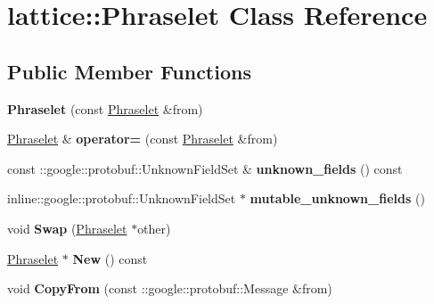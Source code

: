 \hypertarget{classlattice_1_1Phraselet}{
\section{lattice::Phraselet Class Reference}
\label{classlattice_1_1Phraselet}
}
\subsection*{Public Member Functions}
\begin{DoxyCompactItemize}
\item 
\hypertarget{classlattice_1_1Phraselet_aad52fffee57cf2c3c738db3911eb4bb9}{
{\bfseries Phraselet} (const \hyperlink{classlattice_1_1Phraselet}{Phraselet} \&from)}
\label{classlattice_1_1Phraselet_aad52fffee57cf2c3c738db3911eb4bb9}

\item 
\hypertarget{classlattice_1_1Phraselet_a351df01d2ffbf4f31cac03ee8c1fc237}{
\hyperlink{classlattice_1_1Phraselet}{Phraselet} \& {\bfseries operator=} (const \hyperlink{classlattice_1_1Phraselet}{Phraselet} \&from)}
\label{classlattice_1_1Phraselet_a351df01d2ffbf4f31cac03ee8c1fc237}

\item 
\hypertarget{classlattice_1_1Phraselet_ad493e6fbf47ab949e24f807b94232c64}{
const ::google::protobuf::UnknownFieldSet \& {\bfseries unknown\_\-fields} () const }
\label{classlattice_1_1Phraselet_ad493e6fbf47ab949e24f807b94232c64}

\item 
\hypertarget{classlattice_1_1Phraselet_a92f57adf0baa33f5152ee431b1aea6e1}{
inline::google::protobuf::UnknownFieldSet $\ast$ {\bfseries mutable\_\-unknown\_\-fields} ()}
\label{classlattice_1_1Phraselet_a92f57adf0baa33f5152ee431b1aea6e1}

\item 
\hypertarget{classlattice_1_1Phraselet_a475dcd429c962649f7f26e9cbd8d5a34}{
void {\bfseries Swap} (\hyperlink{classlattice_1_1Phraselet}{Phraselet} $\ast$other)}
\label{classlattice_1_1Phraselet_a475dcd429c962649f7f26e9cbd8d5a34}

\item 
\hypertarget{classlattice_1_1Phraselet_aec2ac47e7a0c661fc443a048b3f0555c}{
\hyperlink{classlattice_1_1Phraselet}{Phraselet} $\ast$ {\bfseries New} () const }
\label{classlattice_1_1Phraselet_aec2ac47e7a0c661fc443a048b3f0555c}

\item 
\hypertarget{classlattice_1_1Phraselet_a2d367abbea6d71d9ffaf3457661b5a42}{
void {\bfseries CopyFrom} (const ::google::protobuf::Message \&from)}
\label{classlattice_1_1Phraselet_a2d367abbea6d71d9ffaf3457661b5a42}


\end{DoxyCompactItemize}
